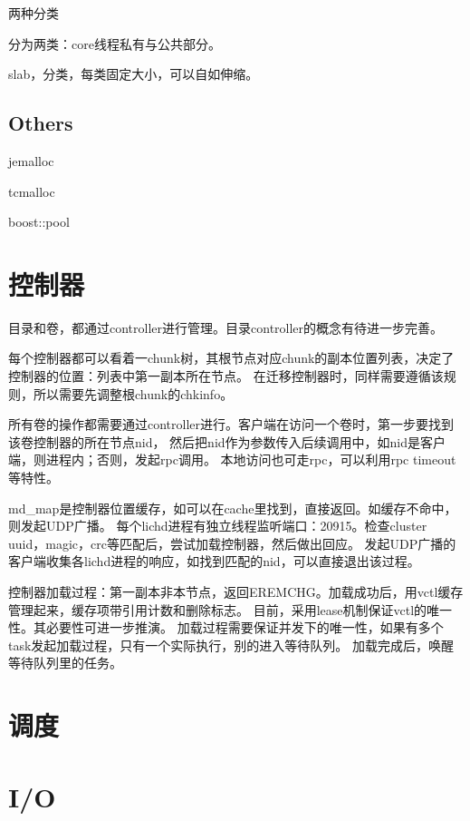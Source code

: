 两种分类
\begin{enumbox}
\item 分为两类：core线程私有与公共部分。
\item slab，分类，每类固定大小，可以自如伸缩。
\end{enumbox}

\subsection{Others}

\begin{enumbox}
\item jemalloc
\item tcmalloc
\item boost::pool
\end{enumbox}

\section{控制器}

目录和卷，都通过controller进行管理。目录controller的概念有待进一步完善。

每个控制器都可以看着一chunk树，其根节点对应chunk的副本位置列表，决定了控制器的位置：列表中第一副本所在节点。
在迁移控制器时，同样需要遵循该规则，所以需要先调整根chunk的chkinfo。

所有卷的操作都需要通过controller进行。客户端在访问一个卷时，第一步要找到该卷控制器的所在节点nid，
然后把nid作为参数传入后续调用中，如nid是客户端，则进程内；否则，发起rpc调用。
本地访问也可走rpc，可以利用rpc timeout等特性。

md\_map是控制器位置缓存，如可以在cache里找到，直接返回。如缓存不命中，则发起UDP广播。
每个lichd进程有独立线程监听端口：20915。检查cluster uuid，magic，crc等匹配后，尝试加载控制器，然后做出回应。
发起UDP广播的客户端收集各lichd进程的响应，如找到匹配的nid，可以直接退出该过程。

控制器加载过程：第一副本非本节点，返回EREMCHG。加载成功后，用vctl缓存管理起来，缓存项带引用计数和删除标志。
目前，采用lease机制保证vctl的唯一性。其必要性可进一步推演。
加载过程需要保证并发下的唯一性，如果有多个task发起加载过程，只有一个实际执行，别的进入等待队列。
加载完成后，唤醒等待队列里的任务。

\section{调度}

\section{I/O}

